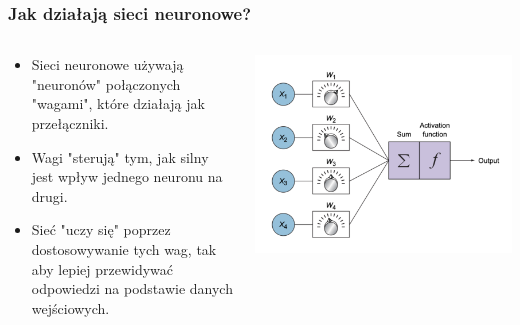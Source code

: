 \documentclass[smaller]{beamer}
\begin{document}
\begin{frame}
\frametitle{Jak działają sieci neuronowe?}

\begin{columns}
    \begin{column}{0.5\textwidth}
        \begin{itemize}
            \item Sieci neuronowe używają "neuronów" połączonych "wagami", które działają jak przełączniki.
            \item Wagi "sterują" tym, jak silny jest wpływ jednego neuronu na drugi.
            \item Sieć "uczy się" poprzez dostosowywanie tych wag, tak aby lepiej przewidywać odpowiedzi na podstawie danych wejściowych.
        \end{itemize}
    \end{column}

    \begin{column}{0.5\textwidth}
        \includegraphics[width=\textwidth]{../manifest/nn-switch.png} %
    \end{column}
\end{columns}

\end{frame}

\end{document}
